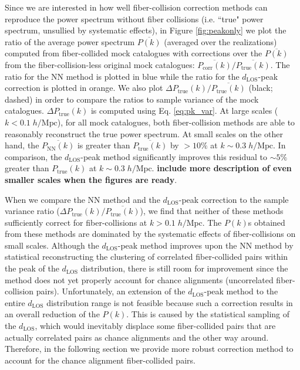 \documentclass{emulateapj}
\begin{document}
Since we are interested in how well fiber-collision correction methods can reproduce the power spectrum without fiber collisions (i.e. ``true" power spectrum, unsullied by systematic effects), in Figure \ref{fig:peakonly} we plot the ratio of the average power spectrum $\overline{P(k)}$ (averaged over the realizations) computed from fiber-collided mock catalogues with corrections over the $\overline{P(k)}$ from the fiber-collision-less original mock catalogues: $\overline{P_{\mathrm{corr}}(k)}/\overline{P_\mathrm{true}(k)}$. The ratio for the NN method is plotted in blue while the ratio for the $d_{\mathrm{LOS}}$-peak correction is plotted in orange. We also plot $\Delta P_\mathrm{true}(k) / \overline{P_\mathrm{true}(k)}$ (black; dashed) in order to compare the ratios to sample variance of the mock catalogues. $\Delta P_\mathrm{true}(k)$ is computed using Eq. \ref{eq:pk_var}. At large scales ($k < 0.1 \; h/\mathrm{Mpc}$), for all mock catalogues, both fiber-collision methods are able to reasonably reconstruct the true power spectrum. At small scales on the other hand, the $\overline{P_\mathrm{NN}(k)}$ is greater than $\overline{P_\mathrm{true}(k)}$ by $> 10 \%$ at $ k \sim 0.3\; h/\mathrm{Mpc}$. In comparison, the $d_\mathrm{LOS}$-peak method significantly improves this residual to $\sim 5\%$ greater than $P_\mathrm{true}(k)$ at $k \sim 0.3 \; h/\mathrm{Mpc}$. {\bf include more description of even smaller scales when the figures are ready}. 

When we compare the NN method and the $d_\mathrm{LOS}$-peak correction to the sample variance ratio ($\Delta P_\mathrm{true}(k) / \overline{P_\mathrm{true}(k)}$), we find that neither of these methods sufficiently correct for fiber-collisions at $k > 0.1\; h/\mathrm{Mpc}$. The $P(k)$s obtained from these methods are dominated by the systematic effects of fiber-collisions on small scales. Although the $d_\mathrm{LOS}$-peak method improves upon the NN method by statistical reconstructing the clustering of correlated fiber-collided pairs within the peak of the $d_\mathrm{LOS}$ distribution, there is still room for improvement since the method does not yet properly account for chance alignments (uncorrelated fiber-collision pairs). Unfortunately, an extension of the $d_\mathrm{LOS}$-peak method to the entire $d_\mathrm{LOS}$ distribution range is not feasible because such a correction results in an overall reduction of the $P(k)$. This is caused by the statistical sampling of the $d_\mathrm{LOS}$, which would inevitably displace some fiber-collided pairs that are actually correlated pairs as chance alignments and the other way around. Therefore, in the following section we provide more robust correction method to account for the chance alignment fiber-collided pairs. 
\end{document}
